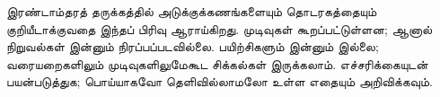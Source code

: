 \documentclass[../../../include/open-logic-chapter]{subfiles}
\begin{document}


\begin{editorial}
இரண்டாம்தரத் தருக்கத்தில் அடுக்குக்கணங்களையும் தொடரகத்தையும்
குறியீடாக்குவதை இந்தப் பிரிவு ஆராய்கிறது. முடிவுகள் கூறப்பட்டுள்ளன;
ஆனால் நிறுவல்கள் இன்னும் நிரப்பப்படவில்லை. பயிற்சிகளும் இன்னும்
இல்லை; வரையறைகளிலும் முடிவுகளிலுமேகூட சிக்கல்கள் இருக்கலாம்.
எச்சரிக்கையுடன் பயன்படுத்துக; பொய்யாகவோ தெளிவில்லாமலோ உள்ள எதையும்
அறிவிக்கவும்.
\end{editorial}





\OLEndChapterHook
\end{document}

